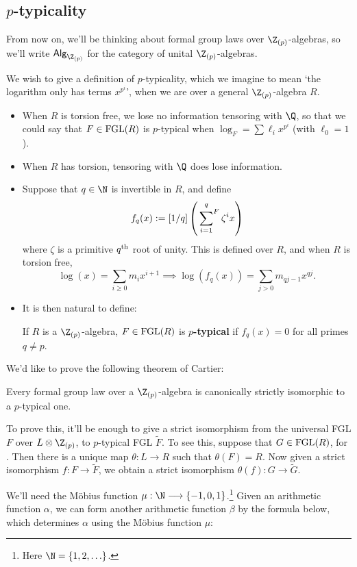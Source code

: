 \documentclass[11pt]{article}
\newcommand\Fsum{\sideset{}{^F}\sum}
\newcommand{\FGL}{\textup{FGL}}
\newcommand{\ZpAlg}{\textsf{Alg}_{\Z_{(p)}}}
\begin{document}
\begin{Formal Group Laws}
\subsection*{$p$-typicality}
From now on, we'll be thinking about formal group laws over $\Z_{(p)}$-algebras, so we'll write $\ZpAlg$ for the category of unital $\Z_{(p)}$-algebras.
\begin{itemise}
\item We wish to give a definition of $p$-typicality, which we imagine to mean `the logarithm only has terms $x^{p^i}$', when we are over a general $\Z_{(p)}$-algebra $R$.
\begin{itemize}\squishlist
\item When $R$ is torsion free, we lose no information tensoring with $\Q$, so that we could say that $F\in\FGL(R)$ is $p$-typical when $\log_{F}=\sum\ell_ix^{p^i}$ (with $\ell_0=1$).
\item When $R$ has torsion, tensoring with $\Q$ does lose information.
\item Suppose that $q\in\N$ is invertible in $R$, and define
\[f_q(x):=[1/q]\left(\Fsum_{i=1}^q\zeta^ix\right)\]
where $\zeta$ is a primitive $q^\textup{th}$ root of unity. This is defined over $R$, and when $R$ is torsion free,
\[\log(x)=\sum_{i\geq0}m_ix^{i+1}\implies \log(f_q(x))=\sum_{j>0}m_{qj-1}x^{qj}.\]
\item It is then natural to define:
\begin{defn*}
If $R$ is a $\Z_{(p)}$-algebra, $F\in\FGL(R)$ is \textbf{$p$-typical} if $f_{q}(x)=0$ for all primes $q\neq p$.
\end{defn*}
\end{itemize}
\item  We'd like to prove the following theorem of Cartier:
\begin{thm*}[A2.1.18]
Every formal group law over a $\Z_{(p)}$-algebra is canonically strictly isomorphic to a $p$-typical one.
\end{thm*}
To prove this, it'll be enough to give a strict isomorphism from the universal FGL $F$ over $L\otimes \Z_{(p)}$, to $p$-typical FGL $\widetilde{F}$. To see this, suppose that $G\in\FGL(R)$, for \smash{$R\in\ZpAlg$}. Then there is a unique map $\theta:L\to R$ such that $\theta(F)=R$. Now given a strict isomorphism $f:F\to\widetilde{F}$, we obtain a strict isomorphism $\theta(f):G\to\widetilde{G}$.
\begin{shaded}
We'll need the M\"obius function $\mu:\N\to\{-1,0,1\}$.\footnote{Here $\N=\{1,2,\ldots\}$.} Given an arithmetic function $\alpha$, we can form another arithmetic function $\beta$ by the formula below, which determines $\alpha$ using the M\"obius function $\mu$:

\end{shaded}
\end{itemise}
\end{Formal Group Laws}
\end{document}
